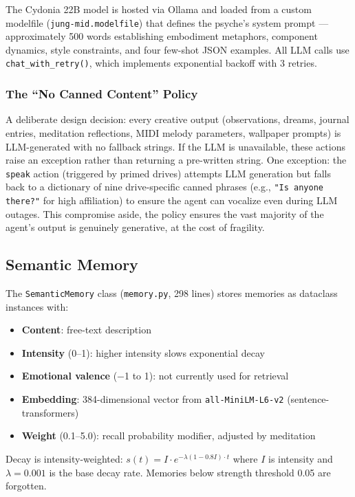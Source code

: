 \documentclass[11pt,oneside]{article}
\begin{document}
The Cydonia 22B model is hosted via Ollama and loaded from a custom modelfile (\texttt{jung-mid.modelfile}) that defines the psyche's system prompt --- approximately 500 words establishing embodiment metaphors, component dynamics, style constraints, and four few-shot JSON examples.
All LLM calls use \texttt{chat\_with\_retry()}, which implements exponential backoff with 3 retries.

\subsubsection{The ``No Canned Content'' Policy}

A deliberate design decision: every creative output (observations, dreams, journal entries, meditation reflections, MIDI melody parameters, wallpaper prompts) is LLM-generated with no fallback strings.
If the LLM is unavailable, these actions raise an exception rather than returning a pre-written string.
One exception: the \texttt{speak} action (triggered by primed drives) attempts LLM generation but falls back to a dictionary of nine drive-specific canned phrases (e.g., \texttt{"Is anyone there?"} for high affiliation) to ensure the agent can vocalize even during LLM outages.
This compromise aside, the policy ensures the vast majority of the agent's output is genuinely generative, at the cost of fragility.

\subsection{Semantic Memory}

The \texttt{SemanticMemory} class (\texttt{memory.py}, 298 lines) stores memories as dataclass instances with:

\begin{itemize}
  \item \textbf{Content}: free-text description
  \item \textbf{Intensity} (0--1): higher intensity slows exponential decay
  \item \textbf{Emotional valence} ($-$1 to 1): not currently used for retrieval
  \item \textbf{Embedding}: 384-dimensional vector from \texttt{all-MiniLM-L6-v2} (sentence-transformers)
  \item \textbf{Weight} (0.1--5.0): recall probability modifier, adjusted by meditation
\end{itemize}

Decay is intensity-weighted: $s(t) = I \cdot e^{-\lambda(1 - 0.8I) \cdot t}$ where $I$ is intensity and $\lambda = 0.001$ is the base decay rate.
Memories below strength threshold 0.05 are forgotten.
\end{document}
